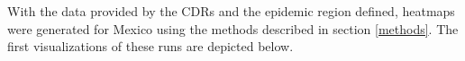 With the data provided by the CDRs and the epidemic region defined, heatmaps were generated for Mexico using the methods described in section \ref{methods}. The first visualizations of these runs are depicted below.
